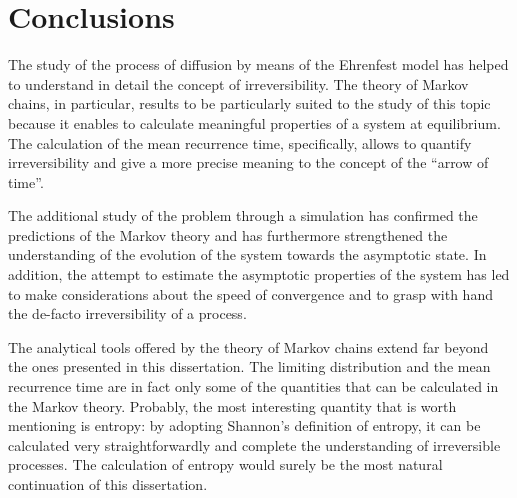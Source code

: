 \chapter{Conclusions}
The study of the process of diffusion by means of the Ehrenfest model has helped to understand in detail the concept of irreversibility. The theory of Markov chains, in particular, results to be particularly suited to the study of this topic because it enables to calculate meaningful properties of a system at equilibrium. The calculation of the mean recurrence time, specifically, allows to quantify irreversibility and give a more precise meaning to the concept of the \enquote{arrow of time}.

The additional study of the problem through a simulation has confirmed the predictions of the Markov theory and has furthermore strengthened the understanding of the evolution of the system towards the asymptotic state. In addition, the attempt to estimate the asymptotic properties of the system has led to make considerations about the speed of convergence and to grasp with hand the de-facto irreversibility of a process.

The analytical tools offered by the theory of Markov chains extend far beyond the ones presented in this dissertation. The limiting distribution and the mean recurrence time are in fact only some of the quantities that can be calculated in the Markov theory. Probably, the most interesting quantity that is worth mentioning is entropy: by adopting Shannon's definition of entropy, it can be calculated very straightforwardly and complete the understanding of irreversible processes. The calculation of entropy would surely be the most natural continuation of this dissertation.